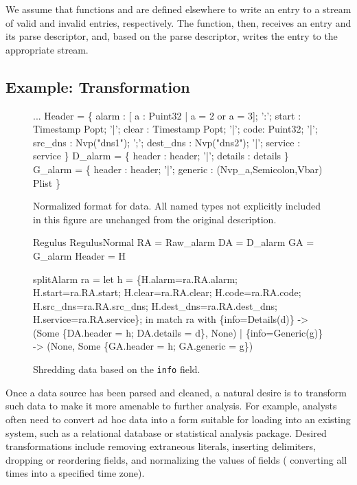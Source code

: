 We assume that functions  and  are
defined elsewhere to write an entry to a stream of valid and invalid
entries, respectively. The  function, then, receives
an entry and its parse descriptor, and, based on the parse descriptor,
writes the entry to the appropriate stream.

\subsection{Example: Transformation}
\label{sec:ex-trans}

\begin{figure}
  \centering
  \begin{code}\scriptsize
...
 Header = \{
       alarm : [ a : Puint32 | a = 2 or a = 3];
 ':';  start :  Timestamp Popt;
 '|';  clear :  Timestamp Popt;
 '|';  code: Puint32;
 '|';  src\_dns  :  Nvp("dns1");
 ';';  dest\_dns :  Nvp("dns2");
 '|';  service  : service
\}
\mbox{}
 D\_alarm = \{
       header   : header;
 '|';  details  : details
 \}
\mbox{}
 G\_alarm = \{
       header   : header;
 '|';  generic  : (Nvp\_a,Semicolon,Vbar) Plist
\}\end{code}
\caption{Normalized format for \darkstar{} data. All named types not
  explicitly included in this figure are unchanged from the original
  \darkstar{} description.}
\label{fig:normal-darkstar}
\end{figure}

\begin{figure}
\begin{code}\scriptsize
{} Regulus
 RegulusNormal
 RA = Raw\_alarm
 DA = D\_alarm
 GA = G\_alarm
 Header = H

 splitAlarm ra =
    let h = 
       \{H.alarm=ra.RA.alarm; H.start=ra.RA.start; 
         H.clear=ra.RA.clear; H.code=ra.RA.code;
         H.src\_dns=ra.RA.src\_dns; H.dest\_dns=ra.RA.dest\_dns;
         H.service=ra.RA.service\};
    in match ra with
        \{info=Details(d)\} -> 
        (Some \{DA.header = h; DA.details = d\}, None)
      | \{info=Generic(g)\} ->
        (None, Some \{GA.header = h; GA.generic = g\})    
  \end{code}
  \caption{Shredding \darkstar{} data based on the {\tt info} field.}
  \label{fig:ex-no-err-check}
\end{figure}

Once a data source has been parsed and cleaned, a natural desire is to
transform such data to make it more amenable to further analysis.  For
example, analysts often need to convert ad hoc data into a form
suitable for loading into an existing system, such as a relational
database or statistical analysis package. Desired transformations
include removing extraneous literals, inserting delimiters, dropping
or reordering fields, and normalizing the values of fields (\eg{}
converting all times into a specified time zone).

